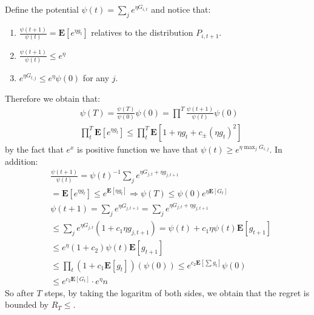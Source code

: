 \documentclass{article}
\newcommand{\expp}[1]{ \mathbf{E} \left[ {#1} \right]}
\begin{document}
\begin{multicols*}{2}
  Define the potential $\psi\left( t \right) =  \sum_{j}{ e^{\eta G_{i,t}}}$ and notice that:
    \begin{enumerate}
      \item $ \frac{\psi\left( t+1 \right)}{\psi\left( t \right)} = \expp{e^{\eta g_{t}}}$ relatives to the distribution $P_{i,t+1}$. 
      \item $ \frac{\psi\left( t+1 \right)}{\psi\left( t \right)} \le e^{\eta}$
      \item $ e^{\eta G_{t,j}} \le e^{\eta} \psi\left( 0 \right)$ for any $j$.
    \end{enumerate}
Therefore we obtain that: 
\begin{equation*}
  \begin{split}
    & \psi\left( T \right) =  \frac{\psi\left( T \right)}{\psi\left( 0 \right)}\psi\left( 0 \right) = \prod^{T}{\frac{\psi\left( t+1 \right)}{\psi\left( t \right)} }\psi\left( 0 \right) \\
  &  \prod^{T}_{t}{\expp{ e^{\eta g_{t}} }}\le \prod^{T}_{t}{\expp{ 1 + \eta g_{t} + c_{\pm}\left( \eta g_{t} \right)^{2} }}
  \end{split}
\end{equation*}
  by the fact that $e^{x}$ is positive function we have that $\psi\left( t \right) \ge e^{\eta \max_j G_{i,j}}$. In addition: 
  \begin{equation*}
    \begin{split}
      & \frac{\psi\left( t+1 \right)}{\psi\left( t \right)} = \psi\left( t \right)^{-1} \sum_{j}{ e^{\eta G_{j,t} + \eta g_{j,t+1}}} \\
      & = \expp{e^{\eta g_{t}}} \le e^{\expp{\eta g_{t}}} \Rightarrow \psi\left( T \right) \le \psi\left( 0 \right) e^{\eta \expp{G_{t}}} \\
      & \psi\left( t + 1 \right) =  \sum_{j}{ e^{\eta G_{j,t+1}}} =\sum_{j}{ e^{\eta G_{j,t} + \eta g_{j,t+1}}}  \\
      & \le \sum_{j}{ e^{\eta G_{j,t}  }\left(  1 + c_{1} \eta g_{j,t+1} \right) }= \psi\left( t \right)  +  c_{1}\eta \psi\left( t \right) \expp{g_{t+1}}  \\
      & \le  e^{\eta} \left( 1 +  c_{2} \right) \psi\left( t \right) \expp{g_{t+1}}  \\
      & \le \prod_{t}{ \left( 1 + c_{1} \expp{g_{t}}\right) }\left( \psi\left( 0 \right) \right) \le e ^{c_{2} \expp{ \sum{g_{t} } }}\psi\left(0  \right) \\ 
      & \le e^{c_{2}\expp{G_{t}}} \cdot e^{\eta}n 
    \end{split}
  \end{equation*}
  So after $T$ steps, by taking the logaritm of both sides, we obtain that the regret is bounded by $ R_{T} \le   $.

\end{multicols*}
\end{document}
